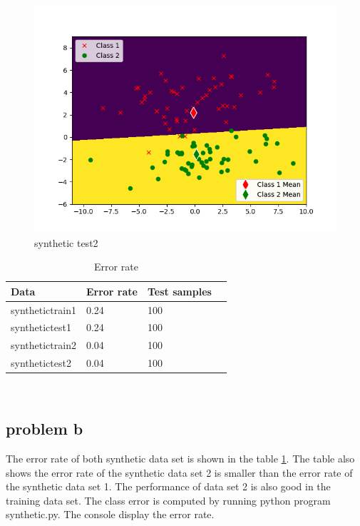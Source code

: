 \documentclass{article}
\begin{document}
	\begin{figure}[hbt!]
		\includegraphics[width=\linewidth]{images/synthetic_test2.png}
		\caption{synthetic test2}
		\label{fig:synthetictest2}
	\end{figure}
		\begin{table}[hbt!]
		\begin{center}
		\begin{tabular}{| l | l | l | p{5cm} |}
		\hline
			Data      & Error rate & Test samples  \\ \hline
			synthetictrain1& 0.24        & 100    \\  \hline
			synthetictest1& 0.24		& 100    \\   \hline
			synthetictrain2& 0.04        & 100    \\  \hline
			synthetictest2& 0.04		& 100    \\   \hline
		\end{tabular}
		\end{center}
	\caption{Error rate}
	\label{table: errorrate}
	\end{table}
	 \\
	\subsection{problem b}
	The error rate of both synthetic data set is shown in the table \ref{table: errorrate}. The table also shows the error rate of the synthetic data set 2 is smaller than the error rate of the synthetic data set 1. The performance of data set 2 is also good in the training data set. The class error is computed by running python program synthetic.py. The console display the error rate. 
\end{document}

